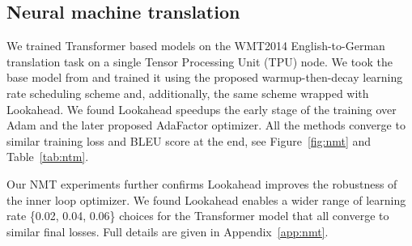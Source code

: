 \subsection{Neural machine translation}
\label{sec:nmt}

We trained Transformer based models \citep{vaswani2017attention} on the WMT2014 English-to-German translation task on a single Tensor Processing Unit (TPU) node. We took the base model from \citet{vaswani2017attention} and trained it using the proposed warmup-then-decay learning rate scheduling scheme and, additionally, the same scheme wrapped with Lookahead. We found Lookahead speedups the early stage of the training over Adam and the later proposed AdaFactor \citep{adafactor} optimizer. All the methods converge to similar training loss and BLEU score at the end, see Figure~\ref{fig:nmt} and Table~\ref{tab:ntm}. 

Our NMT experiments further confirms Lookahead improves the robustness of the inner loop optimizer. We found Lookahead enables a wider range of learning rate \{0.02, 0.04, 0.06\} choices for the Transformer model that all converge to similar final losses. Full details are given in Appendix~\ref{app:nmt}.

